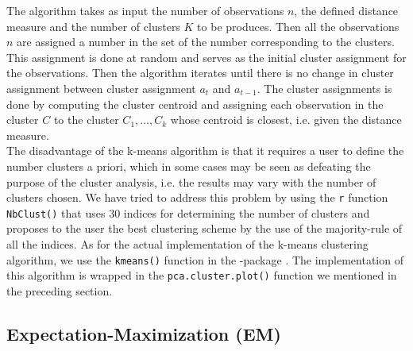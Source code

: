 \documentclass[../thesis.tex]{subfiles}
\begin{document}
\newpage
\noindent The algorithm takes as input the number of observations $n$, the defined distance measure and the number of clusters $K$ to be produces. Then all the observations $n$ are assigned a number in the set of the number corresponding to the clusters. This assignment is done at random and serves as the initial cluster assignment for the observations. Then the algorithm iterates until there is no change in cluster assignment between cluster assignment $a_t$ and $a_{t-1}$. The cluster assignments is done by computing the cluster centroid and assigning each observation in the cluster $C$ to the cluster $C_1, \hdots, C_k$ whose centroid is closest, i.e. given the distance measure. \\
\indent The disadvantage of the k-means algorithm is that it requires a user to define the number clusters a priori, which in some cases may be seen as defeating the purpose of the cluster analysis, i.e. the results may vary with the number of clusters chosen. We have tried to address this problem by using the \texttt{r} function \texttt{NbClust()} \citep{nbclust} that uses 30 indices for determining the number of clusters and proposes to the user the best clustering scheme by the use of the majority-rule of all the indices. As for the actual implementation of the k-means clustering algorithm, we use the \texttt{kmeans()} function in the -package \citep{stats}. The implementation of this algorithm is wrapped in the \texttt{pca.cluster.plot()} function we mentioned in the preceding section.

\vspace*{-0,25cm}\subsection{Expectation-Maximization (EM)}
\label{subsec:em}
\end{document}
